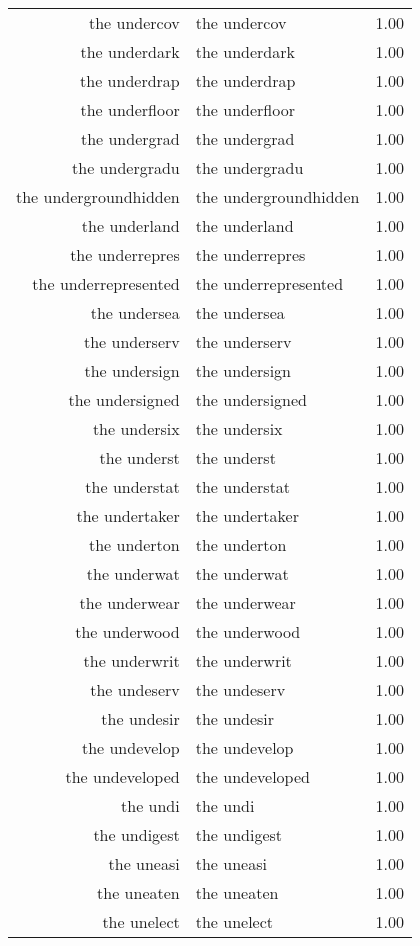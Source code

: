 \begin{table}[ht]
\begin{tabular}{rlr}
  the undercov & the undercov & 1.00 \\ 
  the underdark & the underdark & 1.00 \\ 
  the underdrap & the underdrap & 1.00 \\ 
  the underfloor & the underfloor & 1.00 \\ 
  the undergrad & the undergrad & 1.00 \\ 
  the undergradu & the undergradu & 1.00 \\ 
  the undergroundhidden & the undergroundhidden & 1.00 \\ 
  the underland & the underland & 1.00 \\ 
  the underrepres & the underrepres & 1.00 \\ 
  the underrepresented & the underrepresented & 1.00 \\ 
  the undersea & the undersea & 1.00 \\ 
  the underserv & the underserv & 1.00 \\ 
  the undersign & the undersign & 1.00 \\ 
  the undersigned & the undersigned & 1.00 \\ 
  the undersix & the undersix & 1.00 \\ 
  the underst & the underst & 1.00 \\ 
  the understat & the understat & 1.00 \\ 
  the undertaker & the undertaker & 1.00 \\ 
  the underton & the underton & 1.00 \\ 
  the underwat & the underwat & 1.00 \\ 
  the underwear & the underwear & 1.00 \\ 
  the underwood & the underwood & 1.00 \\ 
  the underwrit & the underwrit & 1.00 \\ 
  the undeserv & the undeserv & 1.00 \\ 
  the undesir & the undesir & 1.00 \\ 
  the undevelop & the undevelop & 1.00 \\ 
  the undeveloped & the undeveloped & 1.00 \\ 
  the undi & the undi & 1.00 \\ 
  the undigest & the undigest & 1.00 \\ 
  the uneasi & the uneasi & 1.00 \\ 
  the uneaten & the uneaten & 1.00 \\ 
  the unelect & the unelect & 1.00 \\ 

\end{tabular}
\end{table}
